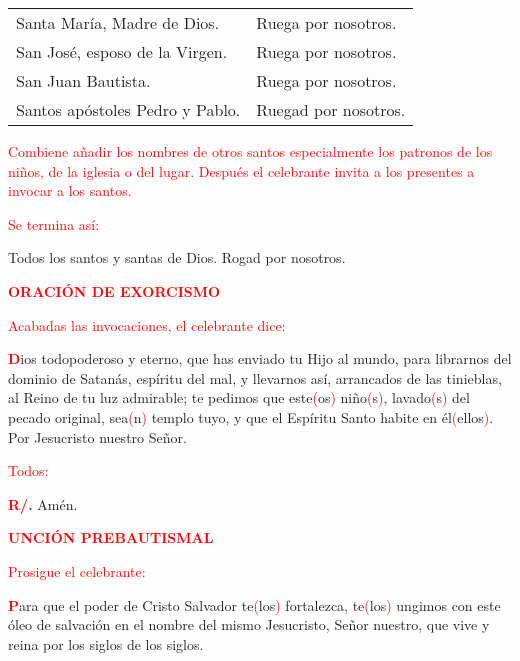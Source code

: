 \documentclass[12pt, letterpaper]{report}
\begin{document}
\noindent
\Large \begin{tabular}{ll}
Santa Mar\'ia, Madre de Dios.& Ruega por nosotros. \\
San Jos\'e, esposo de la Virgen.& Ruega por nosotros. \\
San Juan Bautista.& Ruega por nosotros. \\
Santos ap\'ostoles Pedro y Pablo.& Ruegad por nosotros.
\end{tabular}

\large {\textcolor{red}{Combiene a\~nadir los nombres de otros santos especialmente los patronos de los ni\~nos, de la iglesia o del lugar. Despu\'es el celebrante invita a los presentes a invocar a los santos.}} 

\large {\textcolor{red}{Se termina as\'i:}} 

\noindent
\Large Todos los santos y santas de Dios. Rogad por nosotros. 

\Large {\bfseries \textcolor{red}{ORACI\'ON DE EXORCISMO}} 

\large {\textcolor{red}{Acabadas las invocaciones, el celebrante dice:}} 

\lettrine[lines=1]{\bfseries \textcolor{red}{D}}{}\Large ios todopoderoso y eterno, que has enviado tu Hijo al mundo, para librarnos del dominio de Satan\'as, esp\'iritu del mal, y llevarnos as\'i, arrancados de las tinieblas, al Reino de tu luz admirable; te pedimos que este\textcolor{red}{(}os\textcolor{red}{)} ni\~no\textcolor{red}{(}s\textcolor{red}{)}, lavado\textcolor{red}{(}s\textcolor{red}{)} del pecado original, sea\textcolor{red}{(}n\textcolor{red}{)} templo tuyo, y que el Esp\'iritu Santo habite en \'el\textcolor{red}{(}ellos\textcolor{red}{)}. Por Jesucristo nuestro Se\~nor.

\newpage

\large {\textcolor{red}{Todos:}}

\Large {\bfseries \textcolor{red}{R/.}} \hspace{0.5cm} Am\'en.


\Large {\bfseries \textcolor{red}{UNCI\'ON PREBAUTISMAL}} 

\large {\textcolor{red}{Prosigue el celebrante:}}

\lettrine[lines=1]{\bfseries \textcolor{red}{P}}{}\Large ara que el poder de Cristo Salvador te\textcolor{red}{(}los\textcolor{red}{)} fortalezca, te\textcolor{red}{(}los\textcolor{red}{)} ungimos con este \'oleo de salvaci\'on en el nombre del mismo Jesucristo, Se\~nor nuestro, que vive y reina por los siglos de los siglos.
\end{document}
